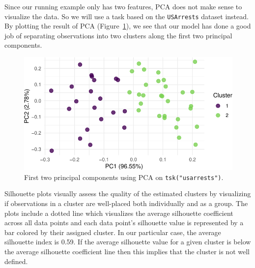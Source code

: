 Since our running example only has two features, PCA does not make sense
to visualize the data. So we will use a task based on the
\texttt{USArrests} dataset instead. By plotting the result of PCA
(Figure~\ref{fig-beyond-clust-usarrests}), we see that our model has
done a good job of separating observations into two clusters along the
first two principal components.

\begin{Shaded}
\begin{Highlighting}[]
\OtherTok{=} \NormalTok{(}\NormalTok{)}
\OtherTok{=} \NormalTok{(}\NormalTok{)}\SpecialCharTok{$}\SpecialCharTok{$}
 \NormalTok{)}
\end{Highlighting}
\end{Shaded}

\begin{figure}[H]

{\centering \includegraphics[width=1\textwidth,height=\textheight]{chapters/chapter13/beyond_regression_and_classification_files/figure-pdf/fig-beyond-clust-usarrests-1.pdf}

}

\caption{\label{fig-beyond-clust-usarrests}First two principal
components using PCA on \texttt{tsk("usarrests")}.}

\end{figure}

Silhouette plots visually assess the quality of the estimated clusters
by visualizing if observations in a cluster are well-placed both
individually and as a group. The plots include a dotted line which
visualizes the average silhouette coefficient across all data points and
each data point's silhouette value is represented by a bar colored by
their assigned cluster. In our particular case, the average silhouette
index is 0.59. If the average silhouette value for a given cluster is
below the average silhouette coefficient line then this implies that the
cluster is not well defined.

